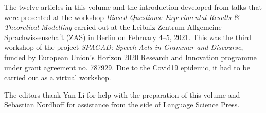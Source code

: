 \begin{refsection}
The twelve articles in this volume and the introduction developed from talks that were presented at the workshop \textit{Biased Questions: Experimental Results \& Theoretical Modelling} carried out at the Leibniz-Zentrum Allgemeine Sprachwissenschaft (ZAS) in Berlin on February 4--5, 2021. This was the third workshop of the project \textit{SPAGAD: Speech Acts in Grammar and Discourse}, funded by European Union's Horizon 2020 Research and Innovation programme under grant agreement no. 787929. Due to the Covid19 epidemic, it had to be carried out as a virtual workshop.

The editors thank Yan Li for help with the preparation of this volume and Sebastian Nordhoff for assistance from the side of Language Science Press. 

\end{refsection}
